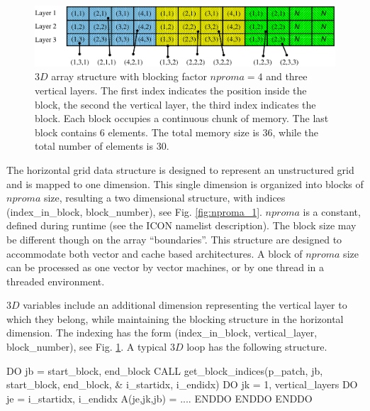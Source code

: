 \documentclass[a4paper,11pt,DIV16,BCOR1cm,titlepage]{scrartcl}
\begin{document}
\begin{figure}[!htd]
  \begin{center}
    \includegraphics[width=16.0cm,draft=false]{../contrib/nproma_3d.pdf}
  \end{center}
  \caption{$3D$ array structure with blocking factor $nproma=4$ and three vertical layers.
  The first index indicates the position inside the block, the second the vertical layer, 
  the third index indicates the block. Each block occupies a continuous chunk of memory. 
  The last block contains 6 elements. 
  The total memory size is 36, while the total number of elements is 30.}
  \label{fig:nproma_3d}
\end{figure}


The horizontal grid data structure is designed to represent an 
unstructured grid and is mapped to one dimension. 
This single dimension is organized into blocks of $nproma$ size, 
resulting a two dimensional structure, with indices  
(index\_in\_block, block\_number), see Fig. \ref{fig:nproma_1}. 
$nproma$ is a constant, defined during runtime (see the ICON namelist description). 
The block size  may be different though on the array ``boundaries''.
This structure are designed to accommodate both vector 
and cache based architectures. A block of $nproma$ size can be processed 
as one vector by vector machines, or by one thread in a threaded environment.


$3D$ variables include an additional dimension representing the vertical layer
to which they belong, while maintaining the blocking structure in the horizontal dimension.
The indexing has the form (index\_in\_block, vertical\_layer, block\_number),
see Fig. \ref{fig:nproma_3d}. A typical $3D$ loop has the following structure.

\begin{fortran}
  DO jb = start_block, end_block
     CALL get_block_indices(p_patch, jb, start_block, end_block, &
                        i_startidx, i_endidx)
     DO jk = 1, vertical_layers
        DO je = i_startidx, i_endidx
            A(je,jk,jb) = ....
        ENDDO
    ENDDO
  ENDDO
\end{fortran}
\end{document}
